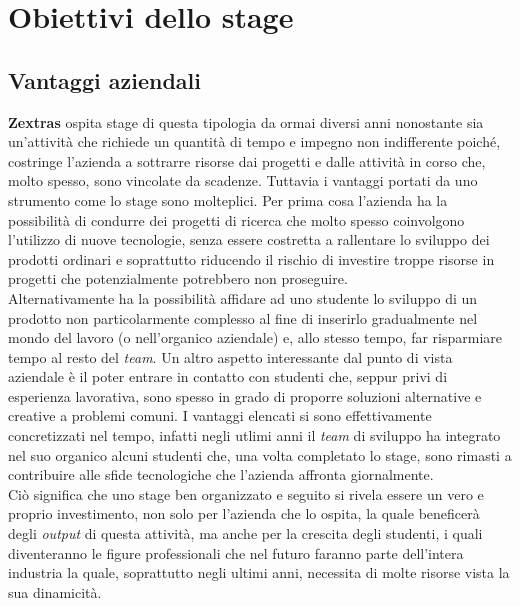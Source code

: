 
\chapter{Obiettivi dello stage}
\label{cap:obiettivi}


\section{Vantaggi aziendali}
    \textbf{Zextras} ospita stage di questa tipologia da ormai diversi anni nonostante sia un'attività che richiede un quantità di tempo e impegno non indifferente poiché, costringe l'azienda a sottrarre risorse dai progetti e dalle attività in corso che, molto spesso, sono vincolate da scadenze. Tuttavia i vantaggi portati da uno strumento come lo stage sono molteplici. Per prima cosa l'azienda ha la possibilità di condurre dei progetti di ricerca che molto spesso coinvolgono l'utilizzo di nuove tecnologie, senza essere costretta a rallentare lo sviluppo dei prodotti ordinari e soprattutto riducendo il rischio di investire troppe risorse in progetti che potenzialmente potrebbero non proseguire. \\
    Alternativamente ha la possibilità affidare ad uno studente lo sviluppo di un prodotto non particolarmente complesso al fine di inserirlo gradualmente nel mondo del lavoro (o nell'organico aziendale) e, allo stesso tempo, far risparmiare tempo al resto del \textit{team}.
    Un altro aspetto interessante dal punto di vista aziendale è il poter entrare in contatto con studenti che, seppur privi di esperienza lavorativa, sono spesso in grado di proporre soluzioni alternative e creative a problemi comuni. I vantaggi elencati si sono effettivamente concretizzati nel tempo, infatti negli utlimi anni il \textit{team} di sviluppo ha integrato nel suo organico alcuni studenti che, una volta completato lo stage, sono rimasti a contribuire alle sfide tecnologiche che l'azienda affronta giornalmente. \\
    Ciò significa che uno stage ben organizzato e seguito si rivela essere un vero e proprio investimento, non solo per l'azienda che lo ospita, la quale beneficerà degli \textit{output} di questa attività, ma anche per la crescita degli studenti, i quali diventeranno le figure professionali che nel futuro faranno parte dell'intera industria la quale, soprattutto negli ultimi anni, necessita di molte risorse vista la sua dinamicità.

